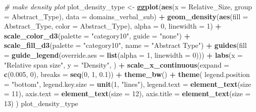 \documentclass[
]{article}
\newenvironment{Shaded}{\begin{snugshade}}{\end{snugshade}}
\newcommand{\AttributeTok}[1]{\textcolor[rgb]{0.13,0.29,0.53}{#1}}
\newcommand{\CommentTok}[1]{\textcolor[rgb]{0.56,0.35,0.01}{\textit{#1}}}
\newcommand{\DecValTok}[1]{\textcolor[rgb]{0.00,0.00,0.81}{#1}}
\newcommand{\FloatTok}[1]{\textcolor[rgb]{0.00,0.00,0.81}{#1}}
\newcommand{\FunctionTok}[1]{\textcolor[rgb]{0.13,0.29,0.53}{\textbf{#1}}}
\newcommand{\NormalTok}[1]{#1}
\newcommand{\OtherTok}[1]{\textcolor[rgb]{0.56,0.35,0.01}{#1}}
\newcommand{\SpecialCharTok}[1]{\textcolor[rgb]{0.81,0.36,0.00}{\textbf{#1}}}
\newcommand{\StringTok}[1]{\textcolor[rgb]{0.31,0.60,0.02}{#1}}
\begin{document}
\begin{Shaded}
\begin{Highlighting}[]
\CommentTok{\# make density plot}
\NormalTok{plot\_density\_type }\OtherTok{\textless{}{-}} \FunctionTok{ggplot}\NormalTok{(}\FunctionTok{aes}\NormalTok{(}\AttributeTok{x =}\NormalTok{ Relative\_Size, }\AttributeTok{group =}\NormalTok{ Abstract\_Type), }\AttributeTok{data =}\NormalTok{ domains\_verbal\_sub) }\SpecialCharTok{+}
  \FunctionTok{geom\_density}\NormalTok{(}\FunctionTok{aes}\NormalTok{(}\AttributeTok{fill =}\NormalTok{ Abstract\_Type, }\AttributeTok{color =}\NormalTok{ Abstract\_Type), }\AttributeTok{alpha =} \DecValTok{0}\NormalTok{, }\AttributeTok{linewidth =} \DecValTok{1}\NormalTok{) }\SpecialCharTok{+}
  \FunctionTok{scale\_color\_d3}\NormalTok{(}\AttributeTok{palette =} \StringTok{"category10"}\NormalTok{, }\AttributeTok{guide =} \StringTok{"none"}\NormalTok{) }\SpecialCharTok{+}
  \FunctionTok{scale\_fill\_d3}\NormalTok{(}\AttributeTok{palette =} \StringTok{"category10"}\NormalTok{, }\AttributeTok{name =} \StringTok{"Abstract Type"}\NormalTok{) }\SpecialCharTok{+}
  \FunctionTok{guides}\NormalTok{(}\AttributeTok{fill =} \FunctionTok{guide\_legend}\NormalTok{(}\AttributeTok{override.aes =} \FunctionTok{list}\NormalTok{(}\AttributeTok{alpha =} \DecValTok{1}\NormalTok{, }\AttributeTok{linewidth =} \DecValTok{0}\NormalTok{))) }\SpecialCharTok{+}
  \FunctionTok{labs}\NormalTok{(}\AttributeTok{x =} \StringTok{"Relative span size"}\NormalTok{, }\AttributeTok{y =} \StringTok{"Density"}\NormalTok{, ) }\SpecialCharTok{+}
  \FunctionTok{scale\_x\_continuous}\NormalTok{(}\AttributeTok{expand =} \FunctionTok{c}\NormalTok{(}\FloatTok{0.005}\NormalTok{, }\DecValTok{0}\NormalTok{), }\AttributeTok{breaks =} \FunctionTok{seq}\NormalTok{(}\DecValTok{0}\NormalTok{, }\DecValTok{1}\NormalTok{, }\FloatTok{0.1}\NormalTok{)) }\SpecialCharTok{+}
  \FunctionTok{theme\_bw}\NormalTok{() }\SpecialCharTok{+}
  \FunctionTok{theme}\NormalTok{(}
    \AttributeTok{legend.position =} \StringTok{"bottom"}\NormalTok{,}
    \AttributeTok{legend.key.size =} \FunctionTok{unit}\NormalTok{(}\DecValTok{1}\NormalTok{, }\StringTok{"lines"}\NormalTok{),}
    \AttributeTok{legend.text =} \FunctionTok{element\_text}\NormalTok{(}\AttributeTok{size =} \DecValTok{11}\NormalTok{),}
    \AttributeTok{axis.text =} \FunctionTok{element\_text}\NormalTok{(}\AttributeTok{size =} \DecValTok{12}\NormalTok{),}
    \AttributeTok{axis.title =} \FunctionTok{element\_text}\NormalTok{(}\AttributeTok{size =} \DecValTok{13}\NormalTok{)}
\NormalTok{  )}
\NormalTok{plot\_density\_type}
\end{Highlighting}
\end{Shaded}
\end{document}
